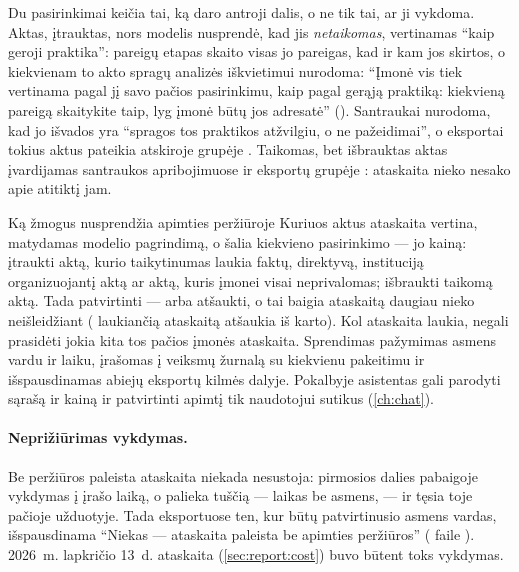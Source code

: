Du pasirinkimai keičia tai, ką daro antroji dalis, o ne tik tai, ar ji vykdoma. Aktas, įtrauktas,
nors modelis nusprendė, kad jis \emph{netaikomas}, vertinamas \enquote{kaip geroji praktika}:
pareigų etapas skaito visas jo pareigas, kad ir kam jos skirtos, o kiekvienam to akto spragų
analizės iškvietimui nurodoma: \enquote{Įmonė vis tiek vertinama pagal jį savo pačios
pasirinkimu, kaip pagal gerąją praktiką: kiekvieną pareigą skaitykite taip, lyg įmonė būtų jos
adresatė} (). Santraukai nurodoma, kad jo išvados yra \enquote{spragos tos
praktikos atžvilgiu, o ne pažeidimai}, o eksportai tokius aktus pateikia atskiroje grupėje
. Taikomas, bet išbrauktas aktas įvardijamas
santraukos apribojimuose ir eksportų grupėje : ataskaita nieko nesako apie atitiktį jam.

\begin{humanbox}{Ką žmogus nusprendžia apimties peržiūroje}
Kuriuos aktus ataskaita vertina, matydamas modelio pagrindimą, o šalia kiekvieno pasirinkimo ---
jo kainą: įtraukti aktą, kurio taikytinumas laukia faktų, direktyvą, instituciją organizuojantį
aktą ar aktą, kuris įmonei visai neprivalomas; išbraukti taikomą aktą. Tada patvirtinti --- arba
atšaukti, o tai baigia ataskaitą daugiau nieko neišleidžiant
( laukiančią ataskaitą atšaukia iš karto). Kol ataskaita
laukia, negali prasidėti jokia kita tos pačios įmonės ataskaita. Sprendimas pažymimas asmens
vardu ir laiku, įrašomas į veiksmų žurnalą su kiekvienu pakeitimu ir išspausdinamas abiejų
eksportų kilmės dalyje. Pokalbyje asistentas gali parodyti sąrašą ir kainą ir patvirtinti
apimtį tik naudotojui sutikus (\cref{ch:chat}).
\end{humanbox}

\paragraph{Neprižiūrimas vykdymas.} Be peržiūros paleista ataskaita niekada nesustoja:
pirmosios dalies pabaigoje vykdymas į  įrašo laiką, o
 palieka tuščią --- laikas be asmens, --- ir tęsia toje pačioje
užduotyje. Tada eksportuose ten, kur būtų patvirtinusio asmens vardas, išspausdinama
\enquote{Niekas --- ataskaita paleista be apimties peržiūros} ( faile
). 2026~m. lapkričio 13~d. ataskaita (\cref{sec:report:cost}) buvo
būtent toks vykdymas.

